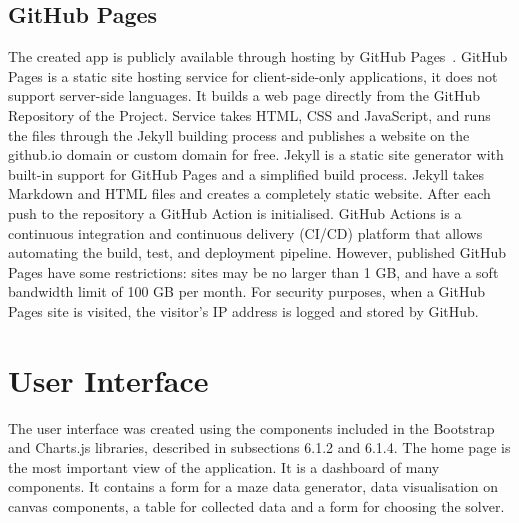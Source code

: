 \subsection{GitHub Pages}
The created app is publicly available through hosting by GitHub Pages~\cite{28}. GitHub Pages is a static site hosting service for client-side-only applications, it does not support
server-side languages. It builds a web page directly from the GitHub Repository of the Project. Service takes HTML, CSS and JavaScript, and runs the files through
the Jekyll building process and publishes a website on the github.io domain or custom domain for free. Jekyll is a static site generator with built-in support for 
GitHub Pages and a simplified build process. Jekyll takes Markdown and HTML files and creates a completely static website. After each push to the repository a GitHub
Action is initialised. GitHub Actions is a continuous integration and continuous delivery (CI/CD) platform that allows automating the build, test, and deployment
pipeline. However, published GitHub Pages have some restrictions: sites may be no larger than 1 GB, and have a soft bandwidth limit of 100 GB per month. For security purposes, 
when a GitHub Pages site is visited, the visitor's IP address is logged and stored by GitHub.\\  
\section{User Interface}
The user interface was created using the components included in the Bootstrap and Charts.js libraries, described in subsections 6.1.2 and 6.1.4.
The home page is the most important view of the application. It is a dashboard of many components. It contains a form for a maze data generator, data visualisation
on canvas components, a table for collected data and a form for choosing the solver.\\
